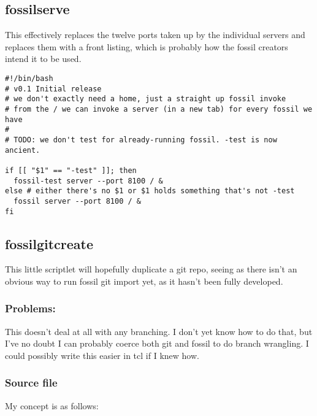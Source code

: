 \documentclass[11pt]{article}
\begin{document}
\subsection*{fossilserve}
\label{sec:org7710993}
This effectively replaces the twelve ports taken up by the individual servers and replaces them with a front listing, which is probably how the fossil creators intend it to be used. 

\begin{verbatim}
#!/bin/bash
# v0.1 Initial release
# we don't exactly need a home, just a straight up fossil invoke
# from the / we can invoke a server (in a new tab) for every fossil we have
#
# TODO: we don't test for already-running fossil. -test is now ancient.

if [[ "$1" == "-test" ]]; then
  fossil-test server --port 8100 / &
else # either there's no $1 or $1 holds something that's not -test
  fossil server --port 8100 / &
fi
\end{verbatim}

\subsection*{fossilgitcreate}
\label{sec:org8b13636}
This little scriptlet will hopefully duplicate a git repo, seeing as there isn't an obvious way
to run fossil git import yet, as it hasn't been fully developed.
\subsubsection*{Problems:}
\label{sec:org078e998}
This doesn't deal at all with any branching. I don't yet know how to do that, but I've no doubt I can
probably coerce both git and fossil to do branch wrangling.
I could possibly write this easier in tcl if I knew how.
\subsubsection*{Source file}
\label{sec:orgd66fd6a}
My concept is as follows:
\end{document}

